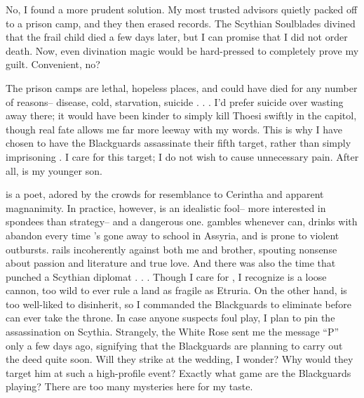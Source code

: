 \documentclass[char]{Kos}
\begin{document}
No, I found a more prudent solution. My most trusted advisors quietly packed \cFugitive{\them} off to a prison camp, and they then erased \cFugitive{\their} records. The Scythian Soulblades divined that the frail child died a few days later, but I can promise that I did not order \cFugitive{\their} death. Now, even divination magic would be hard-pressed to completely prove my guilt. Convenient, no?

The prison camps are lethal, hopeless places, and \cFugitive{\they} could have died for any number of reasons-- disease, cold, starvation, suicide . . . I'd prefer suicide over wasting away there; it would have been kinder to simply kill Thoesi swiftly in the capitol, though \cFugitive{\their} real fate allows me far more leeway with my words. This is why I have chosen to have the Blackguards assassinate their fifth target, rather than simply imprisoning \cPoet{\them}. I care for this target; I do not wish to cause \cPoet{\them} unnecessary pain. After all, \cPoet{\they} is my younger son.

\cPoet{\They} is a poet, adored by the crowds for \cPoet{\their} resemblance to Cerintha and \cPoet{\their} apparent magnanimity. In practice, however, \cPoet{\they} is an idealistic fool-- more interested in spondees than strategy-- and a dangerous one. \cPoet{\They} gambles whenever \cPoet{\they} can, drinks with abandon every time \cPoet{\they}'s gone away to school in Assyria, and is prone to violent outbursts. \cPoet{\They} rails incoherently against both me and\cPoet{\their} brother, spouting nonsense about passion and literature and true love. And there was also the time that \cPoet{\they} punched a Scythian diplomat . . . Though I care for \cPoet{\them}, I recognize \cPoet{\they} is a loose cannon, too wild to ever rule a land as fragile as Etruria. On the other hand, \cPoet{\they} is too well-liked to disinherit, so I commanded the Blackguards to eliminate \cPoet{\them} before \cPoet{\they} can ever take the throne. In case anyone suspects foul play, I plan to pin the assassination on Scythia. Strangely, the White Rose sent me the message ``P'' only a few days ago, signifying that the Blackguards are planning to carry out the deed quite soon. Will they strike at the wedding, I wonder? Why would they target him at such a high-profile event? Exactly what game are the Blackguards playing? There are too many mysteries here for my taste.
\end{document}
